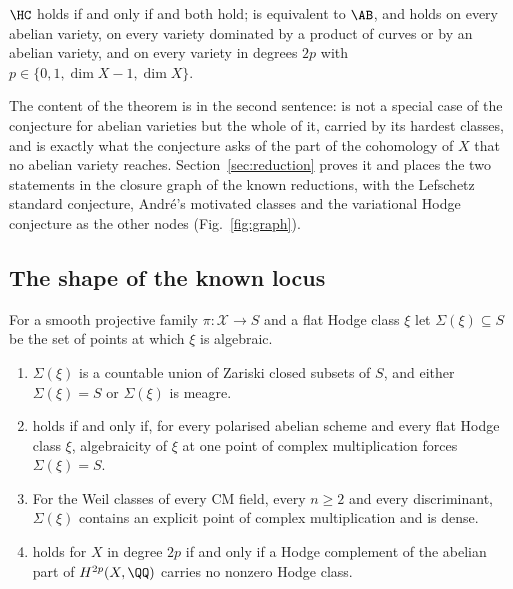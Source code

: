 \begin{theorem}[Reduction]\label{thm:intro-reduction}
$\HC$ holds if and only if \Fii{} and \Fiii{} both hold; \Fii{} is equivalent to $\AB$, and \Fiii{} holds on every abelian variety, on every variety dominated by a product of curves or by an abelian variety, and on every variety in degrees $2p$ with $p\in\{0,1,\dim X-1,\dim X\}$.
\end{theorem}

The content of the theorem is in the second sentence: \Fii{} is not a special case of the conjecture for abelian varieties but the whole of it, carried by its hardest classes, and \Fiii{} is exactly what the conjecture asks of the part of the cohomology of $X$ that no abelian variety reaches. Section~\ref{sec:reduction} proves it and places the two statements in the closure graph of the known reductions, with the Lefschetz standard conjecture, Andr\'e's motivated classes and the variational Hodge conjecture as the other nodes (Fig.~\ref{fig:graph}).

\subsection{The shape of the known locus}

For a smooth projective family $\pi\colon\mathcal{X}\to S$ and a flat Hodge class $\xi$ let $\Sigma(\xi)\subseteq S$ be the set of points at which $\xi$ is algebraic.

\begin{theorem}\label{thm:intro-loci}
\leavevmode
\begin{enumerate}[label=\textup{(\roman*)},leftmargin=2.4em,itemsep=2pt]
\item $\Sigma(\xi)$ is a countable union of Zariski closed subsets of $S$, and either $\Sigma(\xi)=S$ or $\Sigma(\xi)$ is meagre.
\item \Fii{} holds if and only if, for every polarised abelian scheme and every flat Hodge class $\xi$, algebraicity of $\xi$ at one point of complex multiplication forces $\Sigma(\xi)=S$.
\item For the Weil classes of every CM field, every $n\ge2$ and every discriminant, $\Sigma(\xi)$ contains an explicit point of complex multiplication and is dense.
\item \Fiii{} holds for $X$ in degree $2p$ if and only if a Hodge complement of the abelian part of $H^{2p}(X,\QQ)$ carries no nonzero Hodge class.
\end{enumerate}
\end{theorem}

